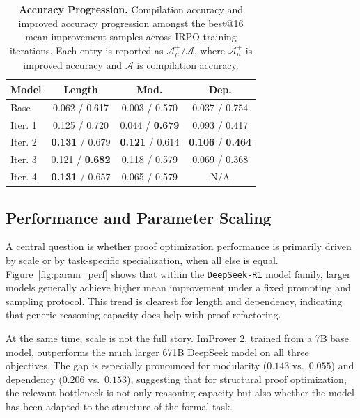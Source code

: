 \begin{table}
\centering
\caption{\textbf{Accuracy Progression.} Compilation accuracy and improved accuracy progression amongst the best@16 mean improvement samples across IRPO training iterations. Each entry is reported as $\mathcal{A}_\mu^+ / \mathcal{A}$, where $\mathcal{A}_\mu^+$ is improved accuracy and $\mathcal{A}$ is compilation accuracy.}
\small
\setlength{\tabcolsep}{5pt}
\begin{tabular}{l|ccc}
\hline
\textbf{Model} & \textbf{Length} & \textbf{Mod.} & \textbf{Dep.} \\
\hline
Base      & 0.062 / 0.617 & 0.003 / 0.570 & 0.037 / 0.754 \\
\hline
Iter. 1 & 0.125 / 0.720 & 0.044 / \textbf{0.679} & 0.093 / 0.417 \\
Iter. 2 & \textbf{0.131} / 0.679 &\textbf{ 0.121} / 0.614 & \textbf{0.106} / \textbf{0.464} \\
Iter. 3 & 0.121 / \textbf{0.682} & 0.118 / 0.579 & 0.069 / 0.368 \\
Iter. 4 & \textbf{0.131} / 0.657 & 0.065 / 0.579 & N/A \\

\hline
\end{tabular}
\label{tab:iter_acc}
\end{table}


\subsection{Performance and Parameter Scaling}
\label{sec:perf_param}

A central question is whether proof optimization performance is primarily driven by scale or by task-specific specialization, when all else is equal. Figure~\ref{fig:param_perf} shows that within the \texttt{DeepSeek-R1} model family, larger models generally achieve higher mean improvement under a fixed prompting and sampling protocol. This trend is clearest for length and dependency, indicating that generic reasoning capacity does help with proof refactoring.

At the same time, scale is not the full story. ImProver 2, trained from a 7B base model, outperforms the much larger 671B DeepSeek model on all three objectives. The gap is especially pronounced for modularity ($0.143$ vs.\ $0.055$) and dependency ($0.206$ vs.\ $0.153$), suggesting that for structural proof optimization, the relevant bottleneck is not only reasoning capacity but also whether the model has been adapted to the structure of the formal task.

